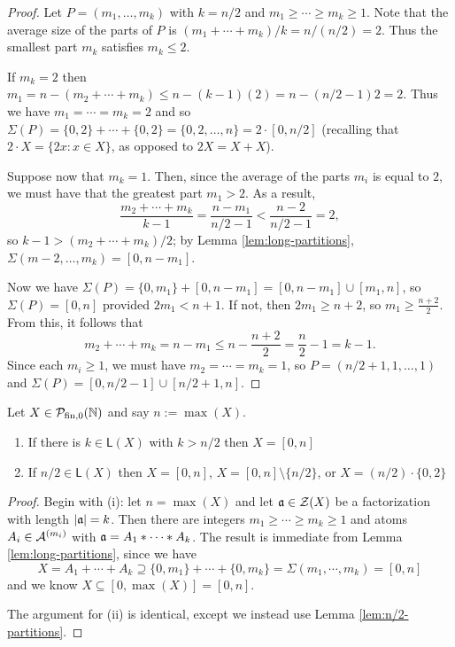 \begin{proof}
Let $P = (m_1,\dots, m_k)$ with $k=n/2$ and $m_1\ge \cdots \ge m_k \ge 1$.
Note that the average size of the parts of $P$ is $(m_1+\cdots+m_k)/k = n/(n/2) = 2$.
Thus the smallest part $m_k$ satisfies $m_k \le 2$.
	
If $m_k = 2$ then $m_1 = n - (m_2+\cdots+m_k) \le n - (k-1)(2) = n - (n/2-1)2 = 2$.
Thus we have $m_1 = \cdots = m_k = 2$ and so $\Sigma(P) = \{0,2\}+\cdots+\{0,2\} = \{0,2,\dots,n\} = 2\cdot[0,n/2]$ (recalling that $2\cdot X = \{2x: x\in X\}$, as opposed to $2X = X+X$).
	
Suppose now that $m_k=1$.
Then, since the average of the parts $m_i$ is equal to $2$, we must have that the greatest part $m_1 > 2$.
As a result, 
\[\frac{m_2+\cdots+m_k}{k-1} = \frac{n-m_1}{n/2-1} < \frac{n-2}{n/2-1} = 2, \]
so $k-1 > (m_2 + \cdots + m_k)/2$; by Lemma \ref{lem:long-partitions}, $\Sigma(m-2,\dots,m_k) = [ 0, n-m_1 ]$.
	
Now we have $\Sigma(P) = \{0,m_1\} + [ 0,n-m_1] = [ 0,n-m_1 ] \cup [ m_1, n]$, so $\Sigma(P) = [ 0,n ]$ provided $2m_1 < n+1$.
If not, then $2m_1 \ge n+2$, so $m_1 \ge \frac{n+2}{2}$.
From this, it follows that 
\[m_2 +\cdots+m_k = n-m_1 \le n - \frac{n+2}{2} = \frac{n}{2}-1 = k-1.\]
Since each $m_i \ge 1$, we must have $m_2 = \cdots = m_k = 1$, so $P = (n/2+1, 1,\dots, 1)$ and $\Sigma(P) = [ 0,n/2-1 ] \cup [ n/2+1,n]$.
\end{proof}

\begin{thm} \label{thm:long factorization implies interval}
Let $X \in \PN$ and say $n := \max(X)$.
\begin{enumerate}[{label=(\roman{*})}]
	\item If there is $k\in \mathsf{L}(X)$ with $k>n/2$ then $X = [0,n]$
	\item If $n/2\in \mathsf{L}(X)$ then $X = [0,n]$, $X=[0,n]\setminus\{n/2\}$, or $X = (n/2)\cdot \{0,2\}$
\end{enumerate}
\end{thm}

\begin{proof}
Begin with (i): let $n = \max(X)$ and let $\aa\in\Z(X)$ be a factorization with length $|\aa| = k$.
Then there are integers $m_1\ge\cdots \ge m_k \ge 1$ and atoms $A_i\in \A^{(m_i)}$ with $\aa = A_1*\cdots*A_k$.
The result is immediate from Lemma \ref{lem:long-partitions}, since we have
\[ X = A_1 + \cdots + A_k \supseteq \{0,m_1\} + \cdots + \{0,m_k\} = \Sigma(m_1,\cdots,m_k) = [ 0,n ] \]
and we know $X \subseteq [ 0,\max(X) ] = [ 0, n ]$.

The argument for (ii) is identical, except we instead use Lemma \ref{lem:n/2-partitions}.
\end{proof}

